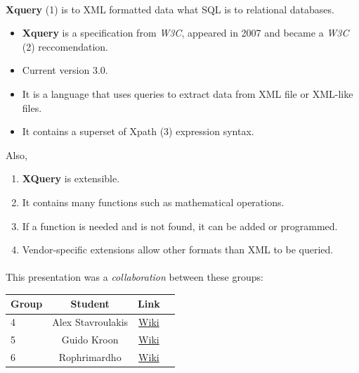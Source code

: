 \documentclass[a4paper,11pt]{report}
\begin{document}
\paragraph{}
\textbf{Xquery} {\footnotesize (1)} is to XML formatted data what SQL is to
relational databases.\\

\begin{itemize}
  \item \textbf{Xquery} is a specification from \textit{W3C}, appeared in 2007 and became a \textit{W3C} {\footnotesize (2)} reccomendation.
  \item Current version 3.0.
  \item It is a language that uses queries to extract data from XML file or XML-like files.
  \item It contains a superset of Xpath {\footnotesize (3)} expression syntax.
\end{itemize}
 
 Also, \\
 
 \begin{enumerate}
  \item \textbf{XQuery} is extensible.
  \item It contains many functions such as mathematical operations.
  \item If a function is needed and is not found, it can be added or programmed.
  \item Vendor-specific extensions allow other formats than XML to be queried.
\end{enumerate}


\paragraph{}
This presentation was a \emph{collaboration} between these groups: \\
 
\begin{center}
 \begin{tabular}{| l | c | c | c |}
 \hline \textbf{Group} & \textbf{Student} & \textbf{Link} \\
 \hline 
 4 & Alex Stavroulakis & \href{https://www.os3.nl/2014-2015/students/alexandros_stavroulakis/es}{Wiki}\\
 \hline 
 5 & Guido Kroon & \href{https://www.os3.nl/2014-2015/students/guido_kroon/es/assignments1}{Wiki} \\ 
 \hline 
 6 & Rophrimardho & \href{https://www.os3.nl/2014-2015/students/rohprimardho/es/homework_1.3}{Wiki} \\ 
 \hline 
 \end{tabular} 
\end{center}
 
\end{document}
